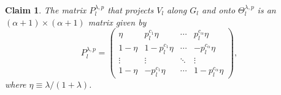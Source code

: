 \documentclass{article}
\numberwithin{myclaim}{section}
\newtheorem{claim}{Claim}
\begin{document}
\begin{claim} \label{claim:formula_for_P_l}
The matrix $P_l^{\lambda,p}$ that projects $V_l$ along $G_l$ and onto $\Theta_l^{\lambda,p}$ is an $(\alpha+1) \times (\alpha+1)$  matrix given by
\begin{equation}
    P_l^{\lambda,p} =    
    \left( 
    \begin{array}{cccc} 
        \eta & p_l^{c_1} \eta & \cdots & p_l^{c_\alpha} \eta \\
        1 - \eta & 1-p_l^{c_1} \eta & \cdots &  - p_l^{c_\alpha} \eta \\
        \vdots & \vdots & \ddots & \vdots \\
        1 - \eta & - p_l^{c_1} \eta & \cdots & 1 - p_l^{c_\alpha} \eta 
    \end{array} 
    \right), \label{eq:P_l_matrix}
\end{equation}  
where $\eta \equiv \lambda / (1 + \lambda)$. 
\end{claim}
\end{document}
